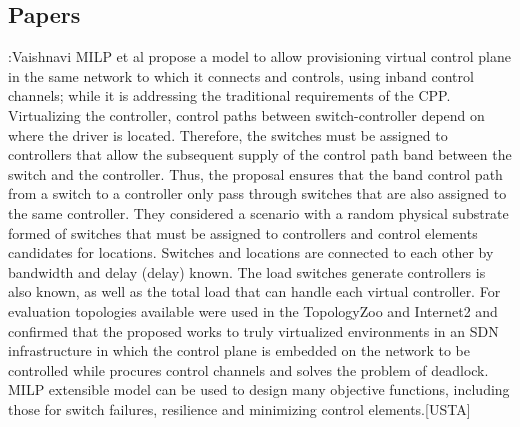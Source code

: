 \documentclass[a4paper,10pt]{article}
\begin{document}
\subsection{Papers}

\cite{VaPo17}:Vaishnavi MILP et al propose a model to allow provisioning virtual control plane in the same network to which it connects and controls, using inband control channels; while it is addressing the traditional requirements of the CPP. Virtualizing the controller, control paths between switch-controller depend on where the driver is located. Therefore, the switches must be assigned to controllers that allow the subsequent supply of the control path band between the switch and the controller. Thus, the proposal ensures that the band control path from a switch to a controller only pass through switches that are also assigned to the same controller.
They considered a scenario with a random physical substrate formed of switches that must be assigned to controllers and control elements candidates for locations. Switches and locations are connected to each other by bandwidth and delay (delay) known. The load switches generate controllers is also known, as well as the total load that can handle each virtual controller.
For evaluation topologies available were used in the TopologyZoo and Internet2 and confirmed that the proposed works to truly virtualized environments in an SDN infrastructure in which the control plane is embedded on the network to be controlled while procures control channels and solves the problem of deadlock. MILP extensible model can be used to design many objective functions, including those for switch failures, resilience and minimizing control elements.[USTA]
\end{document}
